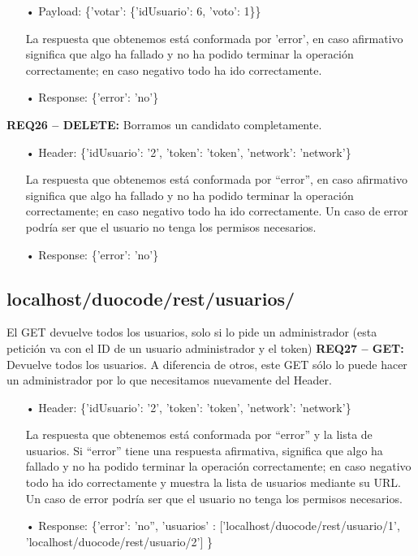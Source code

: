 \begin{itemize}
\item[•]
Payload: 
\{'votar': \{'idUsuario': 6, 'voto': 1\}\}
\vspace{1em}

La respuesta que obtenemos está conformada por 'error', en caso afirmativo significa que algo ha fallado y no ha podido terminar la operación correctamente; en caso negativo todo ha ido correctamente. 
\item[•]
Response: 
\{'error': 'no'\}
\end{itemize}

\textbf{REQ26 – DELETE:} Borramos un candidato completamente.

\begin{itemize}
\item[•]
Header: 
\{'idUsuario': '2', 'token': 'token', 'network': 'network'\}
\vspace{1em}

La respuesta que obtenemos está conformada por “error”, en caso afirmativo significa que algo ha fallado y no ha podido terminar la operación correctamente; en caso negativo todo ha ido correctamente. Un caso de error podría ser que el usuario no tenga los permisos necesarios.

\item[•]
Response: 
\{'error': 'no'\}
\end{itemize}

\subsection{localhost/duocode/rest/usuarios/}
El GET devuelve todos los usuarios, solo si lo pide un administrador (esta petición va con el ID de un usuario administrador y el token)
\textbf{REQ27 – GET:} Devuelve todos los usuarios. A diferencia de otros, este GET sólo lo puede hacer un administrador por lo que necesitamos nuevamente del Header.

\begin{itemize}
\item[•]
Header:
\{'idUsuario': '2', 'token': 'token', 'network': 'network'\}
\vspace{1em}

La respuesta que obtenemos está conformada por “error” y la lista de usuarios. Si “error” tiene una respuesta afirmativa, significa que algo ha fallado y no ha podido terminar la operación correctamente; en caso negativo todo ha ido correctamente y muestra la lista de usuarios mediante su URL. Un caso de error podría ser que el usuario no tenga los permisos necesarios.

\item[•]
Response: 
\{'error': 'no”, 'usuarios' : ['localhost/duocode/rest/usuario/1', 'localhost/duocode/rest/usuario/2'] \}
\end{itemize}

